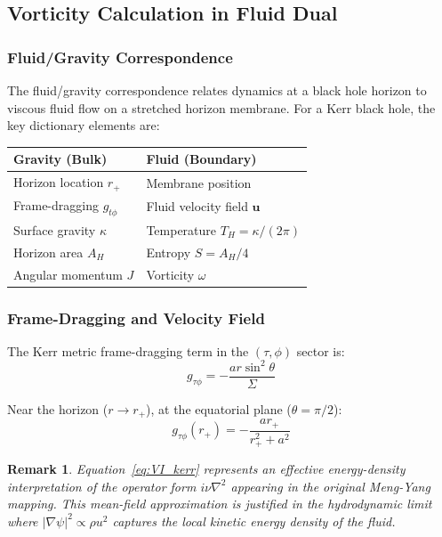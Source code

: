 \documentclass[11pt]{article}
\newtheorem{remark}{Remark}
\begin{document}
\subsection{Vorticity Calculation in Fluid Dual}
\label{subsec:vorticity-dual}

\subsubsection{Fluid/Gravity Correspondence}

The fluid/gravity correspondence relates dynamics at a black hole horizon to viscous fluid flow on a stretched horizon membrane. For a Kerr black hole, the key dictionary elements are:

\begin{center}
\begin{tabular}{|l|l|}
\hline
\textbf{Gravity (Bulk)} & \textbf{Fluid (Boundary)} \\
\hline
Horizon location $r_+$ & Membrane position \\
Frame-dragging $g_{t\phi}$ & Fluid velocity field $\mathbf{u}$ \\
Surface gravity $\kappa$ & Temperature $T_H = \kappa/(2\pi)$ \\
Horizon area $A_H$ & Entropy $S = A_H/4$ \\
Angular momentum $J$ & Vorticity $\omega$ \\
\hline
\end{tabular}
\end{center}

\subsubsection{Frame-Dragging and Velocity Field}

The Kerr metric frame-dragging term in the $(\tau, \phi)$ sector is:
\begin{equation}
g_{\tau\phi} = -\frac{a r \sin^2\theta}{\Sigma}
\end{equation}

Near the horizon ($r \to r_+$), at the equatorial plane ($\theta = \pi/2$):
\begin{equation}
g_{\tau\phi}(r_+) = -\frac{a r_+}{r_+^2 + a^2}
\end{equation}

\begin{remark}
Equation~\eqref{eq:VI_kerr} represents an effective energy-density interpretation of the
operator form $i\nu\nabla^2$ appearing in the original Meng-Yang mapping. This mean-field
approximation is justified in the hydrodynamic limit where $|\nabla\psi|^2 \propto \rho u^2$
captures the local kinetic energy density of the fluid.
\end{remark}
\end{document}
